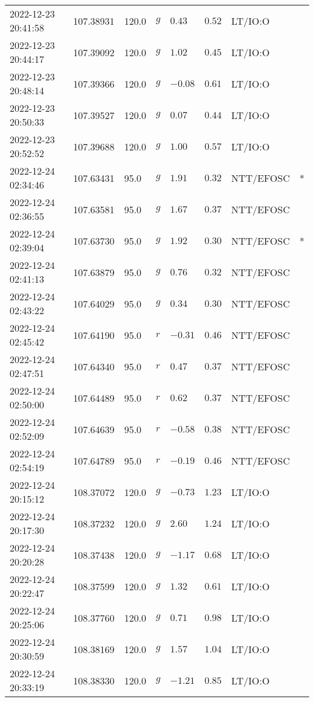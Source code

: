 \documentclass{nature_plusfigure}
\begin{document}
\begin{supplement}
\begin{center}
\begin{longtable}{llllllll}
2022-12-23 20:41:58 & 107.38931 & 120.0 & $g$ & $0.43$ & $0.52$ & LT/IO:O &  \\ 
2022-12-23 20:44:17 & 107.39092 & 120.0 & $g$ & $1.02$ & $0.45$ & LT/IO:O &  \\ 
2022-12-23 20:48:14 & 107.39366 & 120.0 & $g$ & $-0.08$ & $0.61$ & LT/IO:O &  \\ 
2022-12-23 20:50:33 & 107.39527 & 120.0 & $g$ & $0.07$ & $0.44$ & LT/IO:O &  \\ 
2022-12-23 20:52:52 & 107.39688 & 120.0 & $g$ & $1.00$ & $0.57$ & LT/IO:O &  \\ 
2022-12-24 02:34:46 & 107.63431 & 95.0 & $g$ & $1.91$ & $0.32$ & NTT/EFOSC & * \\ 
2022-12-24 02:36:55 & 107.63581 & 95.0 & $g$ & $1.67$ & $0.37$ & NTT/EFOSC &  \\ 
2022-12-24 02:39:04 & 107.63730 & 95.0 & $g$ & $1.92$ & $0.30$ & NTT/EFOSC & * \\ 
2022-12-24 02:41:13 & 107.63879 & 95.0 & $g$ & $0.76$ & $0.32$ & NTT/EFOSC &  \\ 
2022-12-24 02:43:22 & 107.64029 & 95.0 & $g$ & $0.34$ & $0.30$ & NTT/EFOSC &  \\ 
2022-12-24 02:45:42 & 107.64190 & 95.0 & $r$ & $-0.31$ & $0.46$ & NTT/EFOSC &  \\ 
2022-12-24 02:47:51 & 107.64340 & 95.0 & $r$ & $0.47$ & $0.37$ & NTT/EFOSC &  \\ 
2022-12-24 02:50:00 & 107.64489 & 95.0 & $r$ & $0.62$ & $0.37$ & NTT/EFOSC &  \\ 
2022-12-24 02:52:09 & 107.64639 & 95.0 & $r$ & $-0.58$ & $0.38$ & NTT/EFOSC &  \\ 
2022-12-24 02:54:19 & 107.64789 & 95.0 & $r$ & $-0.19$ & $0.46$ & NTT/EFOSC &  \\ 
2022-12-24 20:15:12 & 108.37072 & 120.0 & $g$ & $-0.73$ & $1.23$ & LT/IO:O &  \\ 
2022-12-24 20:17:30 & 108.37232 & 120.0 & $g$ & $2.60$ & $1.24$ & LT/IO:O &  \\ 
2022-12-24 20:20:28 & 108.37438 & 120.0 & $g$ & $-1.17$ & $0.68$ & LT/IO:O &  \\ 
2022-12-24 20:22:47 & 108.37599 & 120.0 & $g$ & $1.32$ & $0.61$ & LT/IO:O &  \\ 
2022-12-24 20:25:06 & 108.37760 & 120.0 & $g$ & $0.71$ & $0.98$ & LT/IO:O &  \\ 
2022-12-24 20:30:59 & 108.38169 & 120.0 & $g$ & $1.57$ & $1.04$ & LT/IO:O &  \\ 
2022-12-24 20:33:19 & 108.38330 & 120.0 & $g$ & $-1.21$ & $0.85$ & LT/IO:O &  \\ 

\end{longtable}
\end{center}
\end{supplement}
\end{document}
